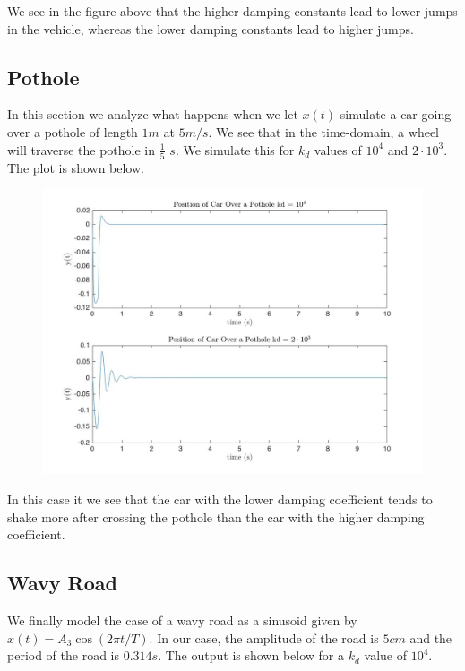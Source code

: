 \documentclass{article}
\begin{document}
We see in the figure above that the higher damping constants lead to lower jumps in the vehicle, whereas the lower damping constants lead to higher jumps.
\FloatBarrier

\subsection{Pothole}
In this section we analyze what happens when we let $x(t)$ simulate a car going over a pothole of length $\si{1m}$ at $5\si{m/s}$. We see that in the time-domain, a wheel will traverse the pothole in $\frac{1}{5}$ $\si{s}$. We simulate this for $k_d$ values of $10^4$ and $2\cdot 10^3$. The plot is shown below.

\begin{figure}[!htbp]
\begin{minipage}{\linewidth}
\includegraphics[width = 1\linewidth, height = 0.5\textheight]{pothole.jpg}
\end{minipage}
\end{figure}


In this case it we see that the car with the lower damping coefficient tends to shake more after crossing the pothole than the car with the higher damping coefficient. 

\subsection{Wavy Road}
We finally model the case of a wavy road as a sinusoid given by $x(t) = A_3 \cos(2 \pi t/ T).$ In our case, the amplitude of the road is $5 \si{cm}$ and the period of the road is $0.314\si{s}$. The output is shown below for a $k_d$ value of $10^4$.
\end{document}

